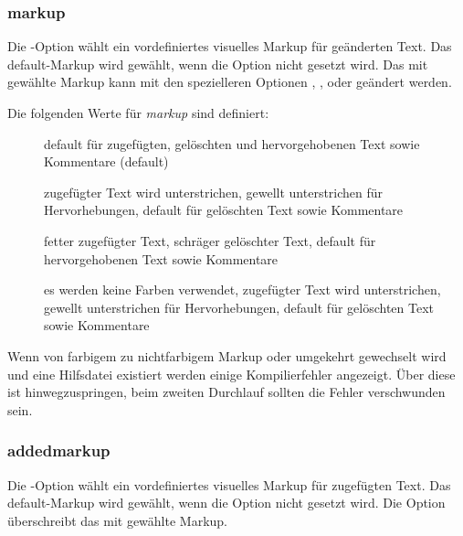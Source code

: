 

\subsubsection{markup}


Die -Option wählt ein vordefiniertes visuelles Markup für geänderten Text.
Das default-Markup wird gewählt, wenn die Option nicht gesetzt wird.
Das mit  gewählte Markup kann mit den spezielleren Optionen , ,  oder  geändert werden.

Die folgenden Werte für \emph{markup} sind definiert:
\begin{description}
	\item [] default für zugefügten, gelöschten und hervorgehobenen Text sowie Kommentare (default)
	\item [] zugefügter Text wird unterstrichen, gewellt unterstrichen für Hervorhebungen, default für gelöschten Text sowie Kommentare
	\item [] fetter zugefügter Text, schräger gelöschter Text, default für hervorgehobenen Text sowie Kommentare
	\item [] es werden keine Farben verwendet, zugefügter Text wird unterstrichen, gewellt unterstrichen für Hervorhebungen, default für gelöschten Text sowie Kommentare
\end{description}


Wenn von farbigem zu nichtfarbigem Markup oder umgekehrt gewechselt wird und eine Hilfsdatei existiert werden einige Kompilierfehler angezeigt.
Über diese ist hinwegzuspringen, beim zweiten Durchlauf sollten die Fehler verschwunden sein.


\subsubsection{addedmarkup}


Die -Option wählt ein vordefiniertes visuelles Markup für zugefügten Text.
Das default-Markup wird gewählt, wenn die Option nicht gesetzt wird.
Die Option  überschreibt das mit  gewählte Markup.

